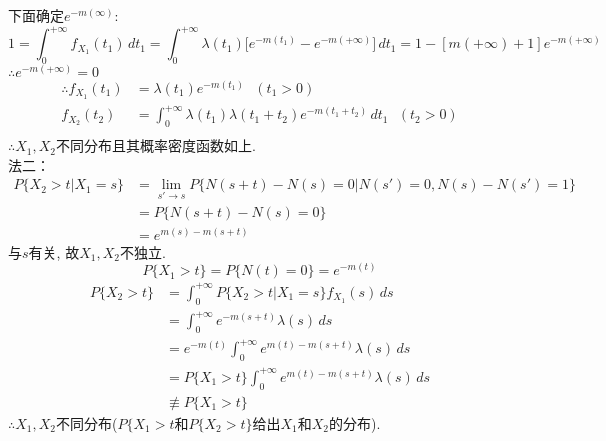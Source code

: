 下面确定$e^{-m(\infty)}$:\\
\[
1 = \int^{+\infty}_0f_{X_1}(t_1)\,dt_1 = \int^{+\infty}_0\lambda(t_1)\Big[e^{-m(t_1)}-e^{-m(+\infty)}\Big]\,dt_1 = 1 - [m(+\infty)+1]e^{-m(+\infty)}
\]
$\therefore e^{-m(+\infty)} = 0$\\
\[
\begin{split}
\therefore f_{X_1}(t_1) & = \lambda(t_1)e^{-m(t_1)}~~~(t_1>0)\\
f_{X_2}(t_2) & = \int^{+\infty}_0\lambda(t_1)\lambda(t_1+t_2)e^{-m(t_1+t_2)}\,dt_1~~~(t_2>0)\\
\end{split}
\]
$\therefore X_1,X_2$不同分布且其概率密度函数如上.\\
法二：
\[
\begin{split}
P\{X_2 > t | X_1 = s\} & = \lim_{s'\rightarrow s}P\big\{N(s+t) - N(s) = 0 | N(s') = 0, N(s) - N(s') = 1\big\}\\
					& = P\big\{N(s+t) - N(s) = 0 \big\}\\
					& = e^{m(s)-m(s+t)}
\end{split}
\]
与$s$有关, 故$X_1, X_2$不独立.\\
\[
P\{X_1 > t\} = P\{N(t) = 0\} = e^{-m(t)}
\]
\[
\begin{split}
P\{X_2 > t\} & = \int^{+\infty}_0P\{X_2 > t | X_1 = s\}f_{X_1}(s)\,ds\\
			& = \int^{+\infty}_0e^{-m(s+t)}\lambda(s)\,ds\\
			& = e^{-m(t)}\int^{+\infty}_0e^{m(t)-m(s+t)}\lambda(s)\,ds\\
			& = P\{X_1 > t\}\int^{+\infty}_0e^{m(t)-m(s+t)}\lambda(s)\,ds\\
			& \not\equiv P\{X_1 > t\}
\end{split}
\]
$\therefore X_1,X_2$不同分布($P\{X_1 > t\text{和}P\{X_2 > t\}$给出$X_1\text{和}X_2$的分布).


